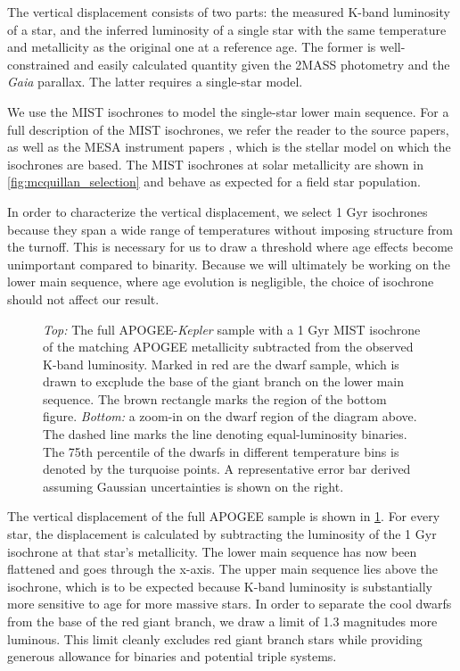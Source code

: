 \documentclass[manuscript]{aastex6}
\newcommand{\Kepler}{\mbox{\textit{Kepler}}}
\newcommand{\Gaia}{\mbox{\textit{Gaia}}}
\begin{document}
The vertical displacement consists of two parts: the measured K-band
luminosity of a star, and the inferred luminosity of a single star with the
same temperature and metallicity as the original one at a reference age. The 
former is well-constrained and easily calculated quantity given the 2MASS 
photometry and the \Gaia{} parallax. The latter requires a single-star model.

We use the MIST \citep{Dotter16,Choi16} isochrones to model the 
single-star lower main sequence. For a full description of the MIST 
isochrones, we refer the reader to the source papers, as well as the MESA 
instrument papers \citep{Paxton11, Paxton13, Paxton15}, which is the stellar 
model on which the isochrones are based. The MIST isochrones at solar
metallicity are shown in \cref{fig:mcquillan_selection} and behave as expected for a field
star population.

In order to characterize the vertical displacement, we select 1 Gyr isochrones 
because they span a wide range of temperatures without imposing
structure from the turnoff. This is necessary for us to draw a threshold where 
age effects become unimportant compared to binarity. Because we will 
ultimately be working on the lower main sequence, where age evolution is 
negligible, the choice of isochrone should not affect our result. 

\begin{figure}[htb]
    \centering
    \caption{\emph{Top:} The full APOGEE-\Kepler{} sample with a 1 Gyr MIST
    isochrone of the matching APOGEE metallicity subtracted from the observed
K-band luminosity. Marked in red are the dwarf sample, which is drawn to
excplude the base of the giant branch on the lower main sequence. The brown
rectangle marks the region of the bottom figure. \emph{Bottom:} a zoom-in on
the dwarf region of the diagram above. The dashed line marks the line denoting
equal-luminosity binaries. The 75th percentile of the dwarfs in different
temperature bins is denoted by the turquoise points. A representative error bar
derived assuming Gaussian uncertainties is shown on the right.}\label{fig:sample_dk}
\end{figure}

The vertical displacement of the full APOGEE sample is shown in 
\cref{fig:sample_dk}. For every star, the displacement is calculated by
subtracting the luminosity of the 1 Gyr isochrone at that star's metallicity.
The lower main sequence has now been flattened and goes through the x-axis. The
upper main sequence lies above the isochrone, which is to be expected because
K-band luminosity is substantially more sensitive to age for more massive
stars. In order to separate the cool dwarfs from the base of the red giant 
branch, we draw a limit of 1.3 magnitudes more luminous. This limit
cleanly excludes red giant branch stars while providing generous allowance for
binaries and potential triple systems.
\end{document}

